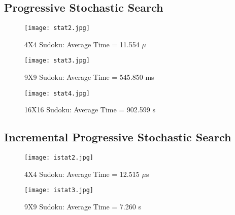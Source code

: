 \documentclass[a4paper]{article}
\begin{document}
\subsection{Progressive Stochastic Search}
\begin{figure}[H]
  \begin{center}
    \texttt{[image: stat2.jpg]}
  \end{center}
  \caption{4X4 Sudoku: Average Time = 11.554 $\mu$}
  \label{fig:pspic}
\end{figure}
\begin{figure}[H]
  \begin{center}
    \texttt{[image: stat3.jpg]}
  \end{center}
  \caption{9X9 Sudoku: Average Time = 545.850 ms}
  \label{fig:pspic}
\end{figure}
\begin{figure}[H]
  \begin{center}
    \texttt{[image: stat4.jpg]}
  \end{center}
  \caption{16X16 Sudoku: Average Time = 902.599 s}
  \label{fig:pspic}
\end{figure}
\subsection{Incremental Progressive Stochastic Search}
\begin{figure}[H]
  \begin{center}
    \texttt{[image: istat2.jpg]}
  \end{center}
  \caption{4X4 Sudoku: Average Time = 12.515 $\mu$s}
  \label{fig:pspic}
\end{figure}
\begin{figure}[H]
  \begin{center}
    \texttt{[image: istat3.jpg]}
  \end{center}
  \caption{9X9 Sudoku: Average Time = 7.260 s}
  \label{fig:pspic}
\end{figure}
\end{document}
